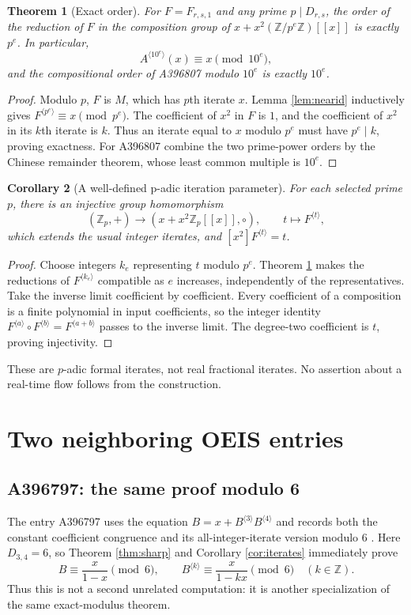 \documentclass[11pt,letterpaper]{article}
\newtheorem{theorem}{Theorem}[section]
\newtheorem{corollary}[theorem]{Corollary}
\theoremstyle{definition}
\theoremstyle{remark}
\newcommand{\Z}{\mathbb Z}
\newcommand{\iter}[2]{#1^{\langle #2\rangle}}
\newcommand{\coeff}[1]{[x^{#1}]}
\begin{document}
\begin{theorem}[Exact order]\label{thm:order}
For $F=F_{r,s,1}$ and any prime $p\mid D_{r,s}$, the order of the
reduction of $F$ in the composition group of
$x+x^2(\Z/p^e\Z)[[x]]$ is exactly $p^e$.  In particular,
\[
 \iter{A}{10^e}(x)\equiv x\pmod {10^e},
\]
and the compositional order of A396807 modulo $10^e$ is exactly $10^e$.
\end{theorem}
\begin{proof}
Modulo $p$, $F$ is $M$, which has $p$th iterate $x$.
Lemma \ref{lem:nearid} inductively gives
$\iter{F}{p^e}\equiv x\pmod {p^e}$.
The coefficient of $x^2$ in $F$ is $1$, and the coefficient of $x^2$
in its $k$th iterate is $k$.  Thus an iterate equal to $x$ modulo $p^e$
must have $p^e\mid k$, proving exactness.
For A396807 combine the two prime-power orders by the Chinese
remainder theorem, whose least common multiple is $10^e$.
\end{proof}

\begin{corollary}[A well-defined p-adic iteration parameter]\label{cor:padictime}
For each selected prime $p$, there is an injective group homomorphism
\[
 (\Z_p,+)\longrightarrow (x+x^2\Z_p[[x]],\circ),
 \qquad t\longmapsto\iter{F}{t},
\]
which extends the usual integer iterates, and
$\coeff{2}\iter{F}{t}=t$.
\end{corollary}
\begin{proof}
Choose integers $k_e$ representing $t$ modulo $p^e$.
Theorem \ref{thm:order} makes the reductions of $\iter{F}{k_e}$
compatible as $e$ increases, independently of the representatives.
Take the inverse limit coefficient by coefficient.  Every coefficient
of a composition is a finite polynomial in input coefficients, so the
integer identity
$\iter{F}{a}\circ\iter{F}{b}=\iter{F}{a+b}$ passes to the inverse limit.
The degree-two coefficient is $t$, proving injectivity.
\end{proof}

These are $p$-adic formal iterates, not real fractional iterates.
No assertion about a real-time flow follows from the construction.

\section{Two neighboring OEIS entries}\label{sec:neighbors}

\subsection{A396797: the same proof modulo 6}
The entry A396797 uses the equation
$B=x+\iter{B}{3}\iter{B}{4}$ and records both the constant coefficient
congruence and its all-integer-iterate version modulo $6$
\cite{oeis797}.  Here $D_{3,4}=6$, so Theorem \ref{thm:sharp} and
Corollary \ref{cor:iterates} immediately prove
\[
 B\equiv\frac{x}{1-x}\pmod6,
 \qquad \iter{B}{k}\equiv\frac{x}{1-kx}\pmod6
 \quad(k\in\Z).
\]
Thus this is not a second unrelated computation: it is another
specialization of the same exact-modulus theorem.
\end{document}
